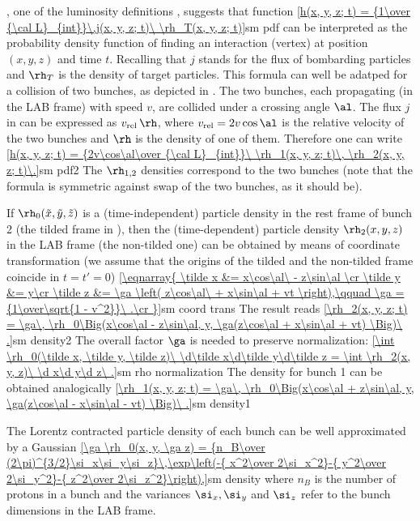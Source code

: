 
, one of the luminosity definitions , suggests that function
\eqref{h(x, y, z; t) = {1\over {\cal L}_{int}}\,j(x, y, z; t)\ \rh_T(x, y, z; t)}{sm pdf}
can be interpreted as the probability density function of finding an interaction (vertex) at position $(x, y, z)$ and time $t$. Recalling that $j$ stands for the flux of bombarding particles and $\rh_T$ is the density of target particles. This formula can well be adatped for a collision of two bunches, as depicted in . The two bunches, each propagating (in the LAB frame) with speed $v$, are collided under a crossing angle $\al$. The flux $j$ in  can be expressed as $v_{\rm rel}\,\rh$, where $v_{\rm rel} = 2v\cos\al$ is the relative velocity of the two bunches and $\rh$ is the density of one of them. Therefore one can write
\eqref{h(x, y, z; t) = {2v\cos\al\over {\cal L}_{int}}\ \rh_1(x, y, z; t)\, \rh_2(x, y, z; t)\.}{sm pdf2}
The $\rh_{1,2}$ densities correspond to the two bunches (note that the formula is symmetric against swap of the two bunches, as it should be).

If $\rh_0(\tilde x, \tilde y, \tilde z)$ is a (time-independent) particle density in the rest frame of bunch 2 (the tilded frame in ), then the (time-dependent) particle density $\rh_2(x, y, z)$ in the LAB frame (the non-tilded one) can be obtained by means of coordinate transformation (we assume that the origins of the tilded and the non-tilded frame coincide in $t=t'=0$)
\eqref{\eqnarray{
\tilde x &= x\cos\al\ - z\sin\al \cr
\tilde y &= y\cr
\tilde z &= \ga \left( z\cos\al\ + x\sin\al + vt \right),\qquad \ga = {1\over\sqrt{1 - v^2}}\ .\cr
}}{sm coord trans}
The result reads
\eqref{\rh_2(x, y, z; t) = \ga\, \rh_0\Big(x\cos\al - z\sin\al, y, \ga(z\cos\al + x\sin\al + vt) \Big)\ .}{sm density2}
The overall factor $\ga$ is needed to preserve normalization:
\eqref{\int \rh_0(\tilde x, \tilde y, \tilde z)\ \d\tilde x\d\tilde y\d\tilde z = \int \rh_2(x, y, z)\ \d x\d y\d z\ .}{sm rho normalization}
The density for bunch 1 can be obtained analogically
\eqref{\rh_1(x, y, z; t) = \ga\, \rh_0\Big(x\cos\al + z\sin\al, y, \ga(z\cos\al - x\sin\al - vt) \Big)\ .}{sm density1}

The Lorentz contracted particle density of each bunch can be well approximated by a Gaussian 
\eqref{\ga \rh_0(x, y, \ga z) = {n_B\over (2\pi)^{3/2}\si_x\si_y\si_z}\,\exp\left(-{ x^2\over 2\si_x^2}-{ y^2\over 2\si_y^2}-{ z^2\over 2\si_z^2}\right),}{sm density}
where $n_B$ is the number of protons in a bunch and the variances $\si_x, \si_y$ and $\si_z$ refer to the bunch dimensions in the LAB frame.

